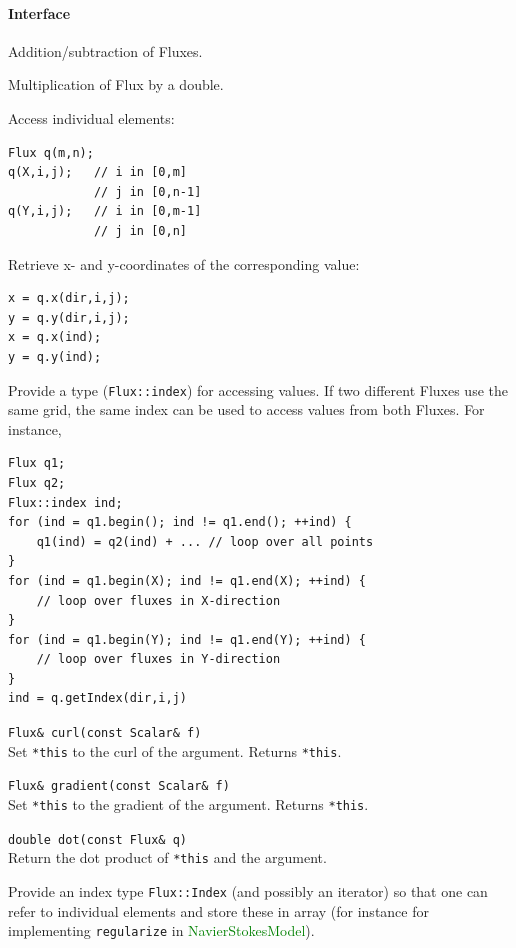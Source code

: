 \documentclass[11pt]{article}
\def\class#1{\textcolor{green}{\ttfamily\small #1}} %
\let\code\lstinline
\begin{document}
\paragraph{Interface}
\begin{description}
	\item Addition/subtraction of Fluxes.
	\item Multiplication of Flux by a double.
	\item Access individual elements:
\begin{lstlisting}
Flux q(m,n);
q(X,i,j);   // i in [0,m]
            // j in [0,n-1]
q(Y,i,j);   // i in [0,m-1]
		    // j in [0,n]

\end{lstlisting}
	\item Retrieve x- and y-coordinates of the corresponding value:
	\begin{lstlisting}
x = q.x(dir,i,j);
y = q.y(dir,i,j);
x = q.x(ind);
y = q.y(ind);
	\end{lstlisting}
	\item Provide a type (\code|Flux::index|) for accessing values.  If two different Fluxes use the same grid, the same index can be used to access values from both Fluxes.  For instance,
	\begin{lstlisting}
Flux q1;
Flux q2;
Flux::index ind;
for (ind = q1.begin(); ind != q1.end(); ++ind) {
	q1(ind) = q2(ind) + ... // loop over all points
}
for (ind = q1.begin(X); ind != q1.end(X); ++ind) {
	// loop over fluxes in X-direction
}
for (ind = q1.begin(Y); ind != q1.end(Y); ++ind) {
	// loop over fluxes in Y-direction
}
ind = q.getIndex(dir,i,j)
	\end{lstlisting}
	
	\item \code|Flux& curl(const Scalar& f)|\\
	Set \code|*this| to the curl of the argument.  Returns \code|*this|.
	\item \code|Flux& gradient(const Scalar& f)|\\
	Set \code|*this| to the gradient of the argument.  Returns \code|*this|.
	\item \code|double dot(const Flux& q)|\\
	Return the dot product of \code|*this| and the argument.
	\item Provide an index type \code|Flux::Index| (and possibly an iterator) so that one can refer to individual elements and store these in array (for instance for implementing \code|regularize| in \class{NavierStokesModel}).
\end{description}
\end{document}
